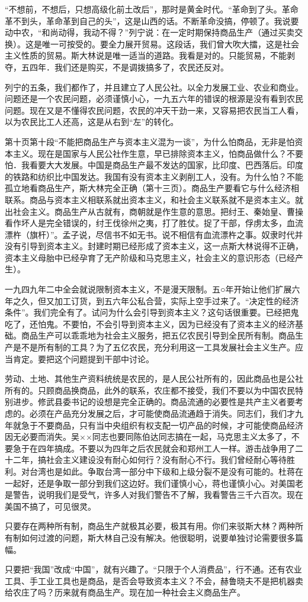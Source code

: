 “不想前，不想后，只想高级化前土改后”，那时是黄金时代。“革命到了头。革命革不到头，革命革到自己的头”，这是山西的话。不断革命没搞，停顿了。我说要动中农，“和尚动得，我动不得？”列宁说：在一定时期保持商品生产（通过买卖交换）。这是唯一可按受的。要全力展开贸易。这段话，我们曾大吹大擂，这是社会主义性质的贸易。斯大林说是唯一适当的道路。我看是对的。只能贸易，不能剥夺，五四年．我们还是购买，不是调拨搞多了，农民还反对。

列宁的五条，我们都作了，并且建立了人民公社。以全力发展工业、农业和商业。问题还是一个农民问题，必须谨慎小心，一九五六年的错误的根源是没有看到农民问题。现在又是不懂得农民问题，农民的冲天干劲一来，又容易把农民当工人看，以为农民比工人还高，这是从右到“左”的转化。

第十页第十段“不能把商品生产与资本主义混为一谈”，为什么怕商品，无非是怕资本主义。现在是国家与人民公社作生意，早已排除资本主义，怕商品做什么？不要怕．我看要大大发展。中国是商品生产最不发达的国家，比印度、巴西落后。印度的铁路和纺织比中国发达。我国有没有资本主义剥削工人，没有。为什么怕？不能孤立地看商品生产，斯大林完全正确（第十三页）。商品生产要看它与什么经济相联系。商品与资本主义相联系就出资本主义，和社会主义联系就不是资本主义。就出社会主义。商品生产从古就有，商朝就是作生意的意思。把纣王、秦始皇、曹操看作坏人是完全错误的，纣王伐徐州之夷，打了胜仗。捉了干部，俘虏太多，血流漂杵（旗杆）”。孟子说，尽信书不如无书。说不相信有血流漂杵之事。奴隶时代并没有引导到资本主义。封建时期已经形成了资本主义，这一点斯大林说得不正确，资本主义母胎中已经孕育了无产阶级和马克思主义，社会主义的意识形态（已经产生）。

一九四九年二中全会就说限制资本主义，不是漫天限制。五○年开始让他们扩展六年之久，但又加工订货，到五六年公私合营，实际上空手过来了。“决定性的经济条件”。我们完全有了。试问为什么会引导到资本主义？这句话很重要。已经把鬼吃了，还怕鬼。不要怕，不会引导到资本主义，因为已经没有了资本主义的经济基础。商品生产可以乖乖地为社会主义服务，把五亿农民引导到全民所有制。商品生产是不是所有制的工具？为了五亿农民，充分利用这一工具发展社会主义生产。应当肯定。要把这个问题提到干部中讨论。

劳动、土地、其他生产资料统统是农民的，是人民公社所有的，因此商品也是公社所有的。只顾商品换商品，此外的联系，农庄都不接受，我们不要以为中国农民特别进步。修武县委书记的设想是完全正确的。商品流通的必要性是共产主义者要考虑的。必须在产品充分发展之后，才可能使商品流通趋于消失。同志们，我们才九年就急于不要商品，只有当中央组织有权支配一切产品的时候，才可能使商品经济因无必要而消失。吴××同志也要同陈伯达同志搞在一起，马克思主义太多了，不要急于在四年搞成。不要以为四年之后农民就会和郑州工人一样。游击战争用了二十二年，搞社会主义建设没有耐心如何行？没有耐心不行。我们曾经耐心等待胜利。对台湾也是如此。争取台湾一部分中下级和上级分裂不是没有可能的。杜蒋在一起好，还是争取一部分到我们这边好。我们谨慎小心，蒋也谨慎小心。对美国老是警告，说明我们是受气，许多人对我们警告不了解，我看警告三千六百次。现在美国不搞了，可见很灵。

只要存在两种所有制，商品生产就极其必要，极其有用。你们来驳斯大林？两种所有制如何过渡的问题，斯大林自己没有解决。他很聪明，说要单独讨论需要很多篇幅。

只要把“我国”改成“中国”，就有兴趣了。“只限于个人消费品”，行不通。还有农业工具、手工业工具也是商品，是否会导致资本主义？不会，赫鲁晓夫不是把机器卖给农庄了吗？历来就有商品生产。现在加一种社会主义商品生产。


